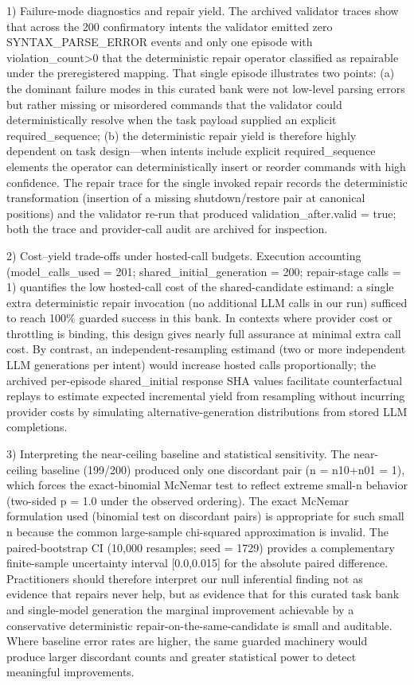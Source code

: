 \documentclass[conference]{IEEEtran}
\begin{document}
1) Failure-mode diagnostics and repair yield. The archived validator traces show that across the 200 confirmatory intents the validator emitted zero SYNTAX\_PARSE\_ERROR events and only one episode with violation\_count>0 that the deterministic repair operator classified as repairable under the preregistered mapping. That single episode illustrates two points: (a) the dominant failure modes in this curated bank were not low-level parsing errors but rather missing or misordered commands that the validator could deterministically resolve when the task payload supplied an explicit required\_sequence; (b) the deterministic repair yield is therefore highly dependent on task design---when intents include explicit required\_sequence elements the operator can deterministically insert or reorder commands with high confidence. The repair trace for the single invoked repair records the deterministic transformation (insertion of a missing shutdown/restore pair at canonical positions) and the validator re-run that produced validation\_after.valid = true; both the trace and provider-call audit are archived for inspection.

2) Cost--yield trade-offs under hosted-call budgets. Execution accounting (model\_calls\_used = 201; shared\_initial\_generation = 200; repair-stage calls = 1) quantifies the low hosted-call cost of the shared-candidate estimand: a single extra deterministic repair invocation (no additional LLM calls in our run) sufficed to reach 100\% guarded success in this bank. In contexts where provider cost or throttling is binding, this design gives nearly full assurance at minimal extra call cost. By contrast, an independent-resampling estimand (two or more independent LLM generations per intent) would increase hosted calls proportionally; the archived per-episode shared\_initial response SHA values facilitate counterfactual replays to estimate expected incremental yield from resampling without incurring provider costs by simulating alternative-generation distributions from stored LLM completions.

3) Interpreting the near-ceiling baseline and statistical sensitivity. The near-ceiling baseline (199/200) produced only one discordant pair (n = n10+n01 = 1), which forces the exact-binomial McNemar test to reflect extreme small-n behavior (two-sided p = 1.0 under the observed ordering). The exact McNemar formulation used (binomial test on discordant pairs) is appropriate for such small n because the common large-sample chi-squared approximation is invalid. The paired-bootstrap CI (10,000 resamples; seed = 1729) provides a complementary finite-sample uncertainty interval [0.0,0.015] for the absolute paired difference. Practitioners should therefore interpret our null inferential finding not as evidence that repairs never help, but as evidence that for this curated task bank and single-model generation the marginal improvement achievable by a conservative deterministic repair-on-the-same-candidate is small and auditable. Where baseline error rates are higher, the same guarded machinery would produce larger discordant counts and greater statistical power to detect meaningful improvements.
\end{document}
